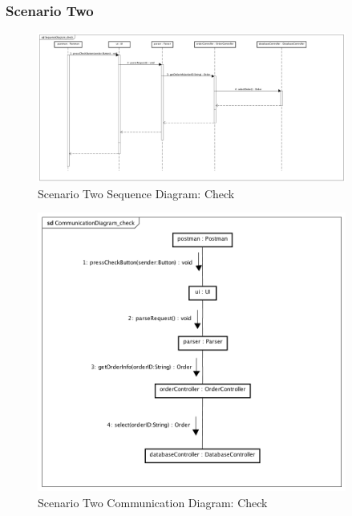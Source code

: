 \documentclass[12pt]{scrreprt}
\begin{document}
\subsubsection{Scenario Two}
\begin{figure}[H]
  \centering\includegraphics[width=4in]{DocumentRes/2SequenceDiagram_check.png}
  \caption{Scenario Two Sequence Diagram: Check}
\end{figure}
\begin{figure}[H]
  \centering\includegraphics[width=4in]{DocumentRes/2CommunicationDiagram_check.png}
  \caption{Scenario Two Communication Diagram: Check}
\end{figure}
\end{document}
